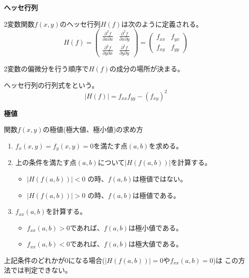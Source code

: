 \documentclass[12pt,b5paper]{ltjsarticle}
\begin{document}
\hrulefill
\textbf{ヘッセ行列}
\hrulefill

2変数関数$f(x,y)$のヘッセ行列$H(f)$は次のように定義される。
\begin{equation}
 H(f)=
  \begin{pmatrix}
   \frac{\partial^2 f}{\partial x\partial x} & \frac{\partial^2 f}{\partial x\partial y}\\
   \frac{\partial^2 f}{\partial y\partial x} & \frac{\partial^2 f}{\partial y\partial y}
  \end{pmatrix}
  =
  \begin{pmatrix}
   f_{xx} & f_{yx}\\
   f_{xy} & f_{yy}
  \end{pmatrix}
\end{equation}

2変数の偏微分を行う順序で$H(f)$の成分の場所が決まる。

ヘッセ行列の行列式をという。
\begin{equation}
 \lvert H(f) \rvert = f_{xx}f_{yy}-(f_{xy})^2
\end{equation}

\hrulefill
\textbf{極値}
\hrulefill

関数$f(x,y)$の極値(極大値、極小値)の求め方

\begin{enumerate}
 \item $f_x(x,y)=f_y(x,y)=0$を満たす点$(a,b)$を求める。
 \item 上の条件を満たす点$(a,b)$について$\lvert H(f(a,b)) \rvert$を計算する。
       \begin{itemize}
        \item $\lvert H(f(a,b)) \rvert <0$ の時、$f(a,b)$は極値ではない。
        \item $\lvert H(f(a,b)) \rvert >0$ の時、$f(a,b)$は極値である。
       \end{itemize}
 \item $f_{xx}(a,b)$を計算する。
       \begin{itemize}
        \item $f_{xx}(a,b) >0$であれば、$f(a,b)$は極小値である。
        \item $f_{xx}(a,b) <0$であれば、$f(a,b)$は極大値である。
       \end{itemize}
\end{enumerate}
上記条件のどれかが0になる場合($\lvert H(f(a,b)) \rvert =0$や$f_{xx}(a,b) =0$)は
この方法では判定できない。

\hrulefill
\end{document}

